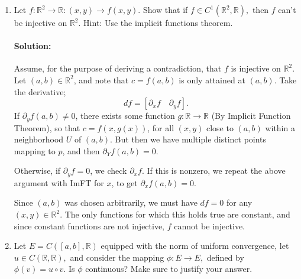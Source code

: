 \documentclass{article}
\begin{document}
\begin{enumerate}
\item   Let $f:\mathbb{R}^2\to\mathbb{R}:(x,y)\to f(x,y).$ Show that if $f\in C^1(\mathbb{R}^2,\mathbb{R}),$ then $f$ can't be injective on $\mathbb{R}^2.$ Hint: Use the implicit functions theorem.
    \paragraph{Solution: } Assume, for the purpose of deriving a contradiction, that $f$ is injective on $\mathbb{R}^2$. Let $(a,b)\in \mathbb{R}^2$, and note that $c=f(a,b)$ is only attained at $(a,b)$. Take the derivative; 
    \[
        df=[\partial_x f\quad \partial_y f]
    .\] 
    If $\partial_yf(a,b)\neq 0$, there exists some function $g:\mathbb{R}\to \mathbb{R}$ (By Implicit Function Theorem), so that $c=f(x,g(x))$, for all $(x,y)$ close to $(a,b)$ within a neighborhood $U$ of $(a,b)$. But then we have multiple distinct points mapping to $p$, and then $\partial_Yf(a,b)=0$. %

    Otherwise, if $\partial_yf=0$, we check $\partial_xf$. If this is nonzero, we repeat the above argument with ImFT for $x$, to get $\partial_xf(a,b)=0$.

    Since $(a,b)$ was chosen arbitrarily, we must have $df=0$ for any $(x,y)\in \mathbb{R}^2$. The only functions for which this holds true are constant, and since constant functions are not injective, $f$ cannot be injective.

    \newpage
\item  Let $E=C([a,b],\mathbb{R})$ equipped with the norm of uniform convergence, let $u\in C(\mathbb{R},\mathbb{R}),$ and consider the mapping $\phi:E\to E,$ defined by $\phi(v)=u\circ v.$ Is $\phi$ continuous? Make sure to justify your answer.

\end{enumerate}
\end{document}
